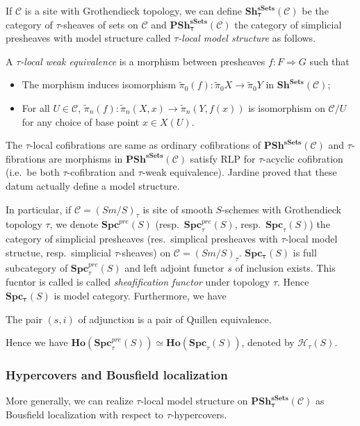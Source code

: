 \documentclass[b5paper,10pt]{article}
\begin{document}
If $\mathcal{C}$ is a site with Grothendieck topology, we can define $\mathbf{Sh^{sSets}_\tau} (\mathcal{C})$ be the category of $\tau$-sheaves of sets on $\mathcal{C}$ and $\mathbf{PSh_\tau^{sSets}}(\mathcal{C})$ the category of simplicial presheaves with model structure called \emph{$\tau$-local model structure} as follows. 
\begin{secdefn}
	A \emph{$\tau$-local weak equivalence} is a morphism between presheaves $f \colon F \Rightarrow G$ such that
	\begin{itemize}
		\item The morphism induces isomorphism $\tilde{\pi}_0(f): \tilde{\pi}_0X \to \tilde{\pi}_0Y$ in $\mathbf{Sh^{Sets}}(\mathcal{C})$;
		\item For all $U \in \mathcal{C}$, $\tilde{\pi}_n(f): \tilde{\pi}_n(X,x) \to \tilde{\pi}_n(Y,f(x))$ is isomorphism on $\mathcal{C}/U$ for any choice of base point $x \in X(U)$.
	\end{itemize}
\end{secdefn}
The $\tau$-local cofibrations are same as ordinary cofibrations of $\mathbf{PSh^{sSets}}(\mathcal{C})$ and $\tau$-fibrations are morphisms in $\mathbf{PSh^{sSets}}(\mathcal{C})$ satisfy RLP for $\tau$-acyclic cofibration (i.e.\ be both $\tau$-cofibration and $\tau$-weak equivalence). Jardine proved that these datum actually define a model structure.

In particular, if $\mathcal{C}=(Sm/S)_\tau$ is site of smooth $S$-schemes with Grothendieck topology $\tau$, we denote $\mathbf{Spc}^{pre}(S)$ (resp.\ $\mathbf{Spc}_\tau^{pre}(S)$, resp.\ $\mathbf{Spc}_\tau(S)$) the category of simplicial presheaves (res.\ simplical presheaves with $\tau$-local model structue, resp.\ simplicial $\tau$-sheaves) on $\mathcal{C}=(Sm/S)_\tau$. $\mathbf{Spc_\tau}(S)$ is full subcategory of $\mathbf{Spc}^{pre}_\tau(S)$ and left adjoint functor $s$ of inclusion exists. This fucntor is called is called \emph{sheafification functor} under topology $\tau$. Hence $\mathbf{Spc_\tau}(S)$ is model category. Furthermore, we have 
\begin{secprop}
	The pair $(s ,i)$ of adjunction is a pair of Quillen equivalence.
\end{secprop}
Hence we have $\mathbf{Ho}(\mathbf{Spc}_\tau^{pre}(S)) \simeq \mathbf{Ho}(\mathbf{Spc}_\tau(S))$, denoted by $\mathcal{H}_\tau(S)$.
\subsubsection{Hypercovers and Bousfield localization}
More generally, we can realize $\tau$-local model structure on $\mathbf{PSh^{sSets}_\tau}(\mathcal{C})$ as Bousfield localization with respect to $\tau$-hypercovers.
\end{document}
